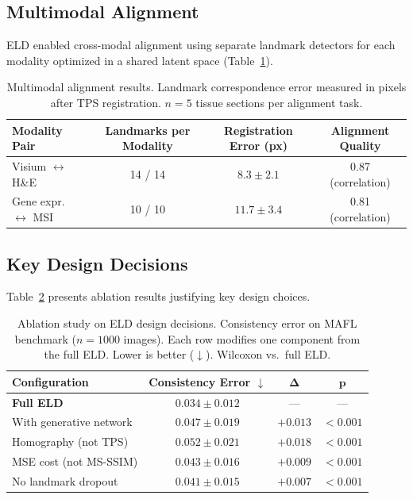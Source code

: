 \documentclass[11pt]{article}
\begin{document}
\subsection{Multimodal Alignment}

ELD enabled cross-modal alignment using separate landmark detectors for each modality optimized in a shared latent space (Table~\ref{tab:multimodal}).

\begin{table}[H]
\centering
\caption{Multimodal alignment results. Landmark correspondence error measured in pixels after TPS registration. $n = 5$ tissue sections per alignment task.}
\label{tab:multimodal}
\begin{tabular}{lccc}
\toprule
\textbf{Modality Pair} & \textbf{Landmarks per Modality} & \textbf{Registration Error (px)} & \textbf{Alignment Quality} \\
\midrule
Visium $\leftrightarrow$ H\&E & 14 / 14 & $8.3 \pm 2.1$ & 0.87 (correlation) \\
Gene expr.\ $\leftrightarrow$ MSI & 10 / 10 & $11.7 \pm 3.4$ & 0.81 (correlation) \\
\bottomrule
\end{tabular}
\end{table}

\subsection{Key Design Decisions}

Table~\ref{tab:ablation} presents ablation results justifying key design choices.

\begin{table}[H]
\centering
\caption{Ablation study on ELD design decisions. Consistency error on MAFL benchmark ($n = 1000$ images). Each row modifies one component from the full ELD. Lower is better ($\downarrow$). Wilcoxon vs.\ full ELD.}
\label{tab:ablation}
\begin{tabular}{lccc}
\toprule
\textbf{Configuration} & \textbf{Consistency Error $\downarrow$} & $\boldsymbol{\Delta}$ & $\boldsymbol{p}$ \\
\midrule
\textbf{Full ELD} & $\mathbf{0.034 \pm 0.012}$ & --- & --- \\
With generative network & $0.047 \pm 0.019$ & $+0.013$ & $< 0.001$ \\
Homography (not TPS) & $0.052 \pm 0.021$ & $+0.018$ & $< 0.001$ \\
MSE cost (not MS-SSIM) & $0.043 \pm 0.016$ & $+0.009$ & $< 0.001$ \\
No landmark dropout & $0.041 \pm 0.015$ & $+0.007$ & $< 0.001$ \\
\bottomrule
\end{tabular}
\end{table}
\end{document}
